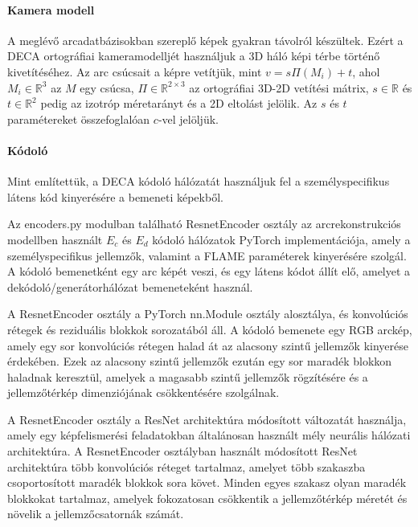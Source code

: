 \documentclass[12pt,a4]{article}
\begin{document}
         \paragraph{Kamera modell}

          A meglévő arcadatbázisokban szereplő képek gyakran távolról készültek.
          Ezért a DECA ortográfiai kameramodelljét használjuk a 3D háló képi térbe történő kivetítéséhez.
          Az arc csúcsait a képre vetítjük, mint $v = s\Pi(M_{i}) + t$, ahol
          $M_{i} \in \mathbb{R}^{3}$ az $M$ egy csúcsa, $\Pi \in \mathbb{R}^{2 \times 3}$ az ortográfiai 3D-2D vetítési mátrix, $s \in \mathbb{R}$ és $t \in \mathbb{R}^{2}$ pedig az izotróp méretarányt és a 2D eltolást jelölik. Az $s$ és $t$ paramétereket összefoglalóan $c$-vel jelöljük.
                     
         \paragraph{Kódoló}

            Mint említettük, a DECA kódoló hálózatát használjuk fel a személyspecifikus látens kód kinyerésére a bemeneti képekből.
            
            Az encoders.py modulban található ResnetEncoder osztály az arcrekonstrukciós modellben használt $E_c$ és $E_d$ kódoló  hálózatok PyTorch implementációja, amely a személyspecifikus jellemzők, valamint a FLAME paraméterek kinyerésére szolgál. 
            A kódoló bemenetként egy arc képét veszi, és egy látens kódot állít elő, amelyet a dekódoló/generátorhálózat bemeneteként használ.
            
            A ResnetEncoder osztály a PyTorch nn.Module osztály alosztálya, és konvolúciós rétegek és reziduális blokkok sorozatából áll.
            A kódoló bemenete egy RGB arckép, amely egy sor konvolúciós rétegen halad át az alacsony szintű jellemzők kinyerése érdekében.
            Ezek az alacsony szintű jellemzők ezután egy sor maradék blokkon haladnak keresztül, amelyek a magasabb szintű jellemzők rögzítésére és a jellemzőtérkép dimenziójának csökkentésére szolgálnak.
            
            A ResnetEncoder osztály a ResNet architektúra módosított változatát használja, amely egy képfelismerési feladatokban általánosan használt mély neurális hálózati architektúra.
            A ResnetEncoder osztályban használt módosított ResNet architektúra több konvolúciós réteget tartalmaz, amelyet több szakaszba csoportosított maradék blokkok sora követ.
            Minden egyes szakasz olyan maradék blokkokat tartalmaz, amelyek fokozatosan csökkentik a jellemzőtérkép méretét és növelik a jellemzőcsatornák számát.
            
\end{document}
